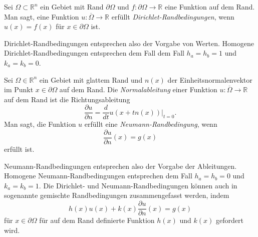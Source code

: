 \begin{definition}
Sei $\Omega\subset\mathbb{R}^n$ ein Gebiet mit Rand $\partial\Omega$
und $f\colon \partial\Omega\to\mathbb{R}$ eine Funktion auf dem Rand.
Man sagt, eine Funktion $u\colon\overline{\Omega}\to\mathbb{R}$ erfüllt 
{\em Dirichlet-Randbedingungen}, wenn
%
%
\(
u(x) = f(x)
\)
für $x\in \partial\Omega$ ist.
\end{definition}

Dirichlet-Randbedingungen entsprechen also der Vorgabe von Werten.
Homogene Dirichlet-Randbedingungen entsprechen dem Fall
dem Fall $h_a=h_b=1$ und $k_a=k_b=0$.

\begin{definition}
Sei $\Omega\in\mathbb{R}^n$ ein Gebiet mit glattem Rand und
$n(x)$ der Einheitsnormalenvektor im Punkt $x\in\partial\Omega$
auf dem Rand.
Die {\em Normalableitung} einer Funktion
%
$u\colon\overline{\Omega}\to \mathbb{R}$ auf dem Rand ist die
Richtungsableitung
\[
\frac{\partial u}{\partial n}
=
\frac{d}{dt} u(x+tn(x))\bigg|_{t=0}.
\]
Man sagt, die Funktion $u$ erfüllt eine {\em Neumann-Randbedingung}, wenn
%
%
\[
\frac{\partial u}{\partial n}(x) = g(x)
\]
erfüllt ist.
\end{definition}

Neumann-Randbedingungen entsprechen also der Vorgabe der Ableitungen.
Homogene Neu\-mann-Rand\-be\-din\-gun\-gen entsprechen dem Fall
$h_a=h_b=0$ und $k_a=k_b=1$.
Die Dirichlet- und Neu\-mann-Randbedingungen können auch in sogenannte
gemischte Randbedingungen zusammengefasst werden, indem 
%
%
\begin{equation}
h(x) u(x) + k(x) \frac{\partial u}{\partial n}(x) = g(x)
\label{buch:orthofunkt:pde:eqn:gemischterandbedingung}
\end{equation}
für  $x \in\partial \Omega$ für auf dem Rand definierte Funktion
$h(x)$ und $k(x)$ gefordert wird.

%
%
